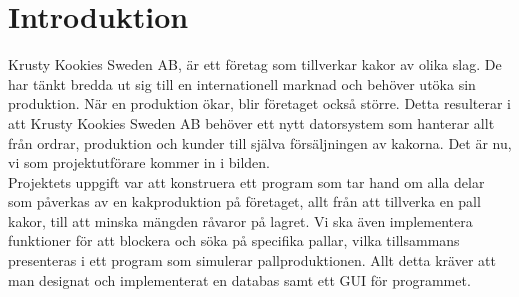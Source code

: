 \section{Introduktion}

Krusty Kookies Sweden AB, är ett företag som tillverkar kakor av olika slag. De har tänkt bredda ut sig till en internationell marknad och behöver utöka sin produktion. När en produktion ökar, blir företaget också större. Detta resulterar i att Krusty Kookies Sweden AB behöver ett nytt datorsystem som hanterar allt från ordrar, produktion och kunder till själva försäljningen av kakorna. Det är nu, vi som projektutförare kommer in i bilden. \\

Projektets uppgift var att konstruera ett program som tar hand om alla delar som påverkas av en kakproduktion på företaget, allt från att tillverka en pall kakor, till att minska mängden råvaror på lagret. Vi ska även implementera funktioner för att blockera och söka på specifika pallar, vilka tillsammans presenteras i ett program som simulerar pallproduktionen. Allt detta kräver att man designat och implementerat en databas samt ett GUI för programmet.
